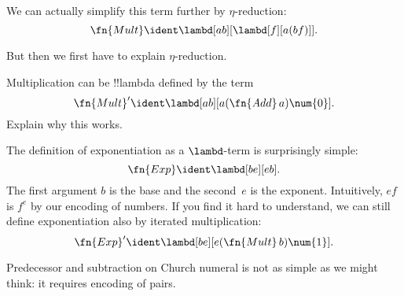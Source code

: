 \documentclass[../../../include/open-logic-section]{subfiles}
\begin{document}
\begin{editorial}
We can actually simplify this term further by $\eta$-reduction:
\[
  \fn{Mult} \ident \lambd[ab][\lambd[f][a (b f)]].
\]

But then we first have to explain $\eta$-reduction.
\end{editorial}

\begin{prob}
Multiplication can be !!{lambda define}d by the term
\[
  \fn{Mult}' \ident \lambd[ab][a (\fn{Add}\, a) \num{0}].
\]
Explain why this works.
\end{prob}

The definition of exponentiation as a $\lambd$-term is
surprisingly simple:
\[
  \fn{Exp} \ident \lambd[be][e b].
\]
The first argument $b$ is the base and the second~$e$ is the exponent.
Intuitively, $e f$ is $f^e$ by our encoding of numbers. If you find it
hard to understand, we can still define exponentiation also by
iterated multiplication:
\[
  \fn{Exp}' \ident \lambd[be][e (\fn{Mult}\, b) \num{1}].
\]

Predecessor and subtraction on Church numeral is not as simple as we
might think: it requires encoding of pairs.
\end{document}
